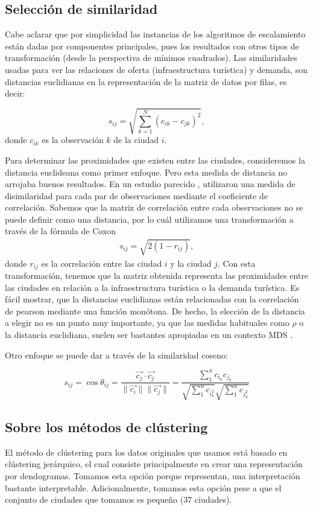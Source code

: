 \documentclass[11pt,letterpaper]{article}
\begin{document}
\subsection{Selección de similaridad}
Cabe aclarar que por simplicidad las instancias de los algoritmos de escalamiento están dadas por componentes principales, pues los resultados con otros tipos de transformación (desde la perspectiva de mínimos cuadrados). Las similaridades usadas para ver las relaciones de oferta (infraestructura turística) y demanda, son distancias euclidianas en la representación de la matriz de datos por filas, es decir:

$$s_{ij} = \sqrt{\sum_{k=1}^N(c_{ik}-c_{jk})^2 },$$
donde $c_{ik}$ es la observación $k$ de la ciudad $i$.

Para determinar las proximidades que existen entre las ciudades, consideremos la distancia euclideana como primer enfoque. Pero esta medida de distancia no arrojaba buenos resultados. En un estudio parecido \cite{mds_tur}, utilizaron una medida de disimilaridad para cada par de observaciones mediante el coeficiente de correlación. Sabemos que la matriz de correlación entre cada observaciones no se puede definir como una distancia, por lo cuál utilizamos una transformación a través de la fórmula de Coxon 
\begin{align} \label{coxon}
    s_{ij}=\sqrt{2(1-r_{ij})},
\end{align}
donde $r_{ij}$ es la correlación entre las ciudad $i$ y la ciudad $j$.
Con esta transformación, tenemos que la matriz obtenida representa las proximidades entre las ciudades en relación a la infraestructura turística o la demanda turística. Es fácil mostrar, que la distancias euclidianas están relacionadas con la correlación de pearson mediante una función monótona. De hecho, la elección de la distancia a elegir no es un punto muy importante, ya que las medidas habituales como $\rho$ o la distancia euclidiana, suelen ser bastantes apropiadas en un contexto MDS \cite{mds_book_ref}. 

Otro enfoque se puede dar a través de la similaridad coseno:

$$
s_{ij}=\operatorname{cos} \theta_{ij}=\frac{\vec{c_j} \cdot \vec{c_j}}{\|\vec{c_i}\|\|\vec{c_j}\|}=\frac{\sum_{1}^{n} c_i_{k} c_j_{k}}{\sqrt{\sum_{1}^{n} c_i_{k}^{2}} \sqrt{\sum_{1}^{n} c_j_{k}^{2}}}
$$


\subsection{Sobre los métodos de clústering}
El método de clústering para los datos originales que usamos está basado en clústering jerárquico, el cual consiste principalmente en crear una representación por dendogramas. Tomamos esta opción porque representan, una interpretación bastante interpretable. Adicionalmente, tomamos esta opción pese a que el conjunto de ciudades que tomamos es pequeño (37 ciudades).\\
\end{document}
